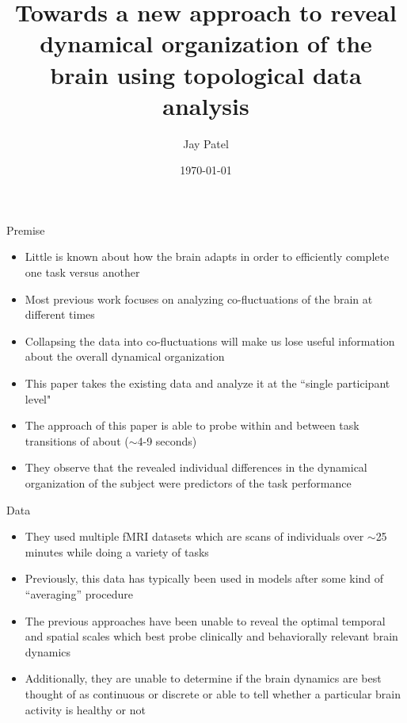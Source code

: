\documentclass{beamer}
\title[Dynamical organization of brain using TDA]{Towards a new approach to reveal dynamical
organization of the brain using topological data analysis} %
\author{Jay Patel} %
\institute[OSU] %
{
The Ohio State University \\ %
\medskip
\textit{patel.3316@osu.edu} %
}
\date{\today} %
\begin{document}
\begin{frame}
    \nocite{mainpaper}
    \titlepage %
\end{frame}

\begin{frame}{Premise}
    \begin{itemize}
        \item Little is known about how the brain adapts in order to efficiently complete one task versus another \pause
        \item Most previous work focuses on analyzing co-fluctuations of the brain at different times\cite{oldDataCollapsed}\pause
        \item Collapsing the data into co-fluctuations will make us lose useful information about the overall dynamical organization \pause
        \item This paper takes the existing data and analyze it at the ``single participant level" \pause
        \item The approach of this paper is able to probe within and between task transitions of about ($\sim$4-9 seconds) \pause
        \item They observe that the revealed individual differences in the dynamical organization of the subject were predictors of the task performance
    \end{itemize}
\end{frame}

\begin{frame}{Data}
    \begin{itemize}
        \item They used multiple fMRI datasets which are scans of individuals over $\sim$25  minutes while doing a variety of tasks \pause
        \item Previously, this data has typically been used in models after some kind of ``averaging'' procedure \pause
        \item The previous approaches have been unable to reveal the optimal temporal and spatial scales which best probe clinically and behaviorally relevant brain dynamics \pause
        \item Additionally, they are unable to determine if the brain dynamics are best thought of as continuous or discrete or able to tell whether a particular brain activity is healthy or not
    \end{itemize}
\end{frame}
\end{document}
